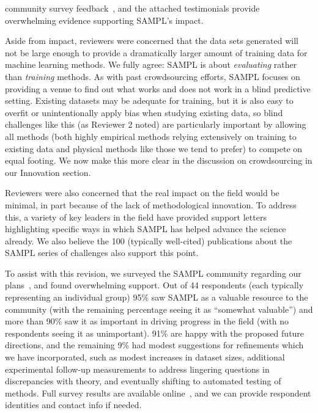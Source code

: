 \documentclass[11pt]{article}
\begin{document}
community survey feedback~\cite{Mobley:2017:eScholarship}, and the attached testimonials provide overwhelming evidence supporting SAMPL's impact.

Aside from impact, reviewers were concerned that the data sets generated will not be large enough to provide a dramatically larger amount of training data for machine learning methods. 
We fully agree: SAMPL is about \emph{evaluating} rather than \emph{training} methods.
As with past crowdsourcing efforts, SAMPL focuses on providing a venue to find out what works and does not work in a blind predictive setting.
Existing datasets may be adequate for training, but it is also easy to overfit or unintentionally apply bias when studying existing data, so blind challenges like this (as Reviewer 2 noted) are particularly important by allowing all methods (both highly empirical methods relying extensively on training to existing data and physical methods like those we tend to prefer) to compete on equal footing.
We now make this more clear in the discussion on crowdsourcing in our Innovation section.

Reviewers were also concerned that the real impact on the field would be minimal, in part because of the lack of methodological innovation.
To address this, a variety of key leaders in the field have provided support letters highlighting specific ways in which SAMPL has helped advance the science already. 
We also believe the 100 (typically well-cited) publications about the SAMPL series of challenges also support this point.

To assist with this revision, we surveyed the SAMPL community regarding our plans~\cite{Mobley:2017:eScholarship}, and found overwhelming support. 
Out of 44 respondents (each typically representing an individual group) 95\% saw SAMPL as a valuable resource to the community (with the remaining percentage seeing it as ``somewhat valuable'') and more than 90\% saw it as important in driving progress in the field (with no respondents seeing it as unimportant). 
91\% are happy with the proposed future directions, and the remaining 9\% had modest suggestions for refinements which we have incorporated, such as modest increases in dataset sizes, additional experimental follow-up measurements to address lingering questions in discrepancies with theory, and eventually shifting to automated testing of methods. 
Full survey results are available online~\cite{Mobley:2017:eScholarship}, and we can provide respondent identities and contact info if needed.
\end{document}
